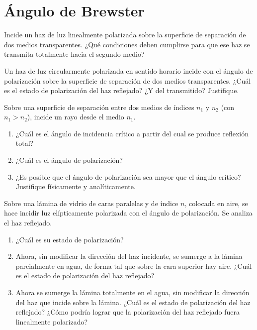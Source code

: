\section*{Ángulo de Brewster}

\item Incide un haz de luz linealmente polarizada sobre la superficie de separación de dos medios transparentes.
¿Qué condiciones deben cumplirse para que ese haz se transmita totalmente hacia el segundo medio?



\item Un haz de luz circularmente polarizada en sentido horario incide con el ángulo de polarización sobre la superficie de separación de dos medios transparentes.
¿Cuál es el estado de polarización del haz reflejado?
¿Y del transmitido?
Justifique.



\item Sobre una superficie de separación entre dos medios de índices $n_1$ y $n_2$ (con $n_1 > n_2$), incide un rayo desde el medio $n_1$.
\begin{enumerate}
	\item ¿Cuál es el ángulo de incidencia crítico a partir del cual se produce reflexión total? 
	\item ¿Cuál es el ángulo de polarización? 
	\item ¿Es posible que el ángulo de polarización sea mayor que el ángulo crítico?
	Justifique físicamente y analíticamente.
\end{enumerate}



\item Sobre una lámina de vidrio de caras paralelas y de índice $n$, colocada en aire, se hace incidir luz elípticamente polarizada con el ángulo de polarización.
Se analiza el haz reflejado.
\begin{enumerate}
	\item ¿Cuál es su estado de polarización?
	\item Ahora, sin modificar la dirección del haz incidente, se sumerge a la lámina parcialmente en agua, de forma tal que sobre la cara superior hay aire.
	¿Cuál es el estado de polarización del haz reflejado?
	\item Ahora se sumerge la lámina totalmente en el agua, sin modificar la dirección del haz que incide sobre la lámina.
	¿Cuál es el estado de polarización del haz reflejado?
	¿Cómo podría lograr que la polarización del haz reflejado fuera linealmente polarizado?
\end{enumerate}
